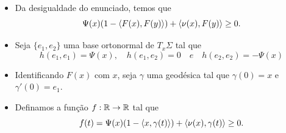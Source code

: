 \documentclass[10pt,a4paper]{beamer}
\theoremstyle{definition}
\begin{document}
\begin{frame}

	\begin{itemize}
		\item Da desigualdade do enunciado, temos que
		\begin{equation*}
		\Psi(x) (1-\left\langle F(x),F(y) \right\rangle) + \left\langle \nu(x),F(y) \right\rangle \geq 0.
		\end{equation*}
		
		\pause
		
		\item Seja $\{ e_1,e_2 \}$ uma base ortonormal de $T_x \Sigma$ tal que
		\begin{equation*}
		h(e_1,e_1)=\Psi(x), \quad h(e_1,e_2)=0 \quad e \quad h(e_2,e_2)=-\Psi(x)
		\end{equation*}
		
		\pause
		
		\item Identificando $F(x)$ com $x$, seja $\gamma$ uma geodésica tal que $\gamma(0)=x$ e $\gamma'(0)=e_1$.
		
		\pause
		
		\item Definamos a função $f: \mathbb R \rightarrow \mathbb R$ tal que
		\begin{equation*}
		f(t) = \Psi(x) (1-\left\langle x,\gamma(t) \right\rangle) + \left\langle \nu(x),\gamma(t) \right\rangle \geq 0.
		\end{equation*}
	
	\end{itemize}

\end{frame}
\end{document}
